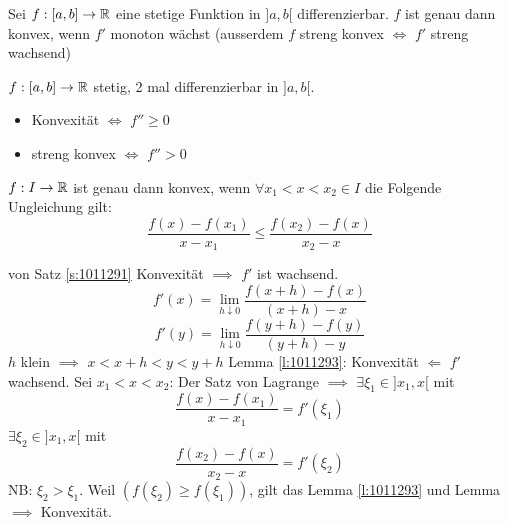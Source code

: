 \begin{Sat}\label{s:1011291}
  Sei $f:[a,b]\to\mathbb{R}$ eine stetige Funktion in $]a,b[$ differenzierbar. $f$ ist genau dann konvex, wenn $f'$ monoton wächst (ausserdem $f$ streng konvex $\iff$ $f'$ streng wachsend)
\end{Sat}
\begin{Kor}
  $f:[a,b]\to\mathbb{R}$ stetig, 2 mal differenzierbar in $]a,b[$.
  \begin{itemize}
    \item Konvexität $\iff$ $f''≥0$
    \item streng konvex $\iff$ $f''>0$
  \end{itemize}
\end{Kor}
\begin{Lem}\label{l:1011293}
  $f:I\to\mathbb{R}$ ist genau dann konvex, wenn $\forall x_1<x<x_2\in I$ die Folgende Ungleichung gilt:
  \[\frac{f(x)-f(x_1)}{x-x_1}≤\frac{f(x_2)-f(x)}{x_2-x}\]
\end{Lem}
\begin{Bew} von Satz \ref{s:1011291}
  Konvexität $\implies$ $f'$ ist wachsend.
  \[f'(x)=\lim_{h\downarrow 0}\frac{f(x+h)-f(x)}{(x+h)-x}\]
  \[f'(y)=\lim_{h\downarrow 0}\frac{f(y+h)-f(y)}{(y+h)-y}\]
  $h$ klein $\implies$ $x<x+h<y<y+h$
  Lemma \ref{l:1011293}:
  Konvexität $\Leftarrow$ $f'$ wachsend. Sei $x_1<x<x_2$: Der Satz von Lagrange $\implies$ $\exists \xi_1\in]x_1,x[$ mit
  \[\frac{f(x)-f(x_1)}{x-x_1}=f'(\xi_1)\]
  $\exists \xi_2\in]x_1,x[$ mit
  \[\frac{f(x_2)-f(x)}{x_2-x}=f'(\xi_2)\]
  NB: $\xi_2>\xi_1$. Weil $(f(\xi_2)≥f(\xi_1))$, gilt das Lemma \ref{l:1011293} und Lemma $\implies$ Konvexität.
\end{Bew}
